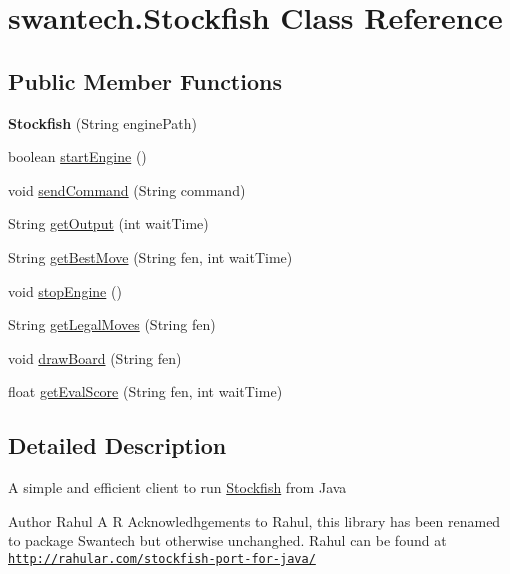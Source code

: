 \hypertarget{classswantech_1_1_stockfish}{}\section{swantech.\+Stockfish Class Reference}
\label{classswantech_1_1_stockfish}
\subsection*{Public Member Functions}
\begin{DoxyCompactItemize}
\item 
\hypertarget{classswantech_1_1_stockfish_a71a5472eb04f588e05418aec0bbbb167}{}{\bfseries Stockfish} (String engine\+Path)\label{classswantech_1_1_stockfish_a71a5472eb04f588e05418aec0bbbb167}

\item 
boolean \hyperlink{classswantech_1_1_stockfish_a19ab1ebc8d457f5743443bebe8ddd252}{start\+Engine} ()
\item 
void \hyperlink{classswantech_1_1_stockfish_a0b971d0f645065262487fb597347d74f}{send\+Command} (String command)
\item 
String \hyperlink{classswantech_1_1_stockfish_ae3766542f6513e9108d6e9ac0f6ea26b}{get\+Output} (int wait\+Time)
\item 
String \hyperlink{classswantech_1_1_stockfish_ab07795178cafa2c3f267ea274f4937be}{get\+Best\+Move} (String fen, int wait\+Time)
\item 
void \hyperlink{classswantech_1_1_stockfish_af97e469fd321bac056aed5251caa7284}{stop\+Engine} ()
\item 
String \hyperlink{classswantech_1_1_stockfish_a3e4c08a813a401dad9c0a8d98930beb0}{get\+Legal\+Moves} (String fen)
\item 
void \hyperlink{classswantech_1_1_stockfish_a15ce41395a20cc5be33df45b527de904}{draw\+Board} (String fen)
\item 
float \hyperlink{classswantech_1_1_stockfish_ad7bf5b45f2fe6b4d60827c734f509a65}{get\+Eval\+Score} (String fen, int wait\+Time)
\end{DoxyCompactItemize}


\subsection{Detailed Description}
A simple and efficient client to run \hyperlink{classswantech_1_1_stockfish}{Stockfish} from Java

\begin{DoxyAuthor}{Author}
Rahul A R Acknowledhgements to Rahul, this library has been renamed to package Swantech but otherwise unchanghed. Rahul can be found at \href{http://rahular.com/stockfish-port-for-java/}{\tt http\+://rahular.\+com/stockfish-\/port-\/for-\/java/} 
\end{DoxyAuthor}


